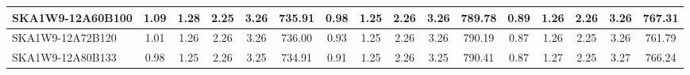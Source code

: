 \begin{table}[H]
{{\begin{tabular}{|lccccc||ccccc||ccccc|}
SKA1W9-12A60B100 & 1.09 \cellcolor{blue!44.85} & 1.28 \cellcolor{red!32.87} & 2.25 \cellcolor{green!28.36} & 3.26 \cellcolor{orange!39.00} & 735.91 \cellcolor{purple!29.65} & 0.98 \cellcolor{blue!44.83} & 1.25 \cellcolor{red!23.18} & 2.26 \cellcolor{green!32.86} & 3.26 \cellcolor{orange!60.00} & 789.78 \cellcolor{purple!18.00} & 0.89 \cellcolor{blue!32.89} & 1.26 \cellcolor{red!23.72} & 2.26 \cellcolor{green!52.62} & 3.26 \cellcolor{orange!32.43} & 767.31 \cellcolor{purple!60.00}\\ \hline 
SKA1W9-12A72B120 & 1.01 \cellcolor{blue!26.99} & 1.26 \cellcolor{red!20.14} & 2.26 \cellcolor{green!42.18} & 3.26 \cellcolor{orange!39.75} & 736.00 \cellcolor{purple!29.93} & 0.93 \cellcolor{blue!26.08} & 1.25 \cellcolor{red!18.00} & 2.26 \cellcolor{green!33.51} & 3.26 \cellcolor{orange!28.35} & 790.19 \cellcolor{purple!26.29} & 0.87 \cellcolor{blue!20.55} & 1.26 \cellcolor{red!33.56} & 2.25 \cellcolor{green!18.00} & 3.26 \cellcolor{orange!18.00} & 761.79 \cellcolor{purple!20.11}\\ \hline 
SKA1W9-12A80B133 & 0.98 \cellcolor{blue!18.00} & 1.25 \cellcolor{red!18.00} & 2.26 \cellcolor{green!45.45} & 3.25 \cellcolor{orange!18.00} & 734.91 \cellcolor{purple!26.39} & 0.91 \cellcolor{blue!18.00} & 1.25 \cellcolor{red!19.92} & 2.26 \cellcolor{green!28.02} & 3.25 \cellcolor{orange!18.00} & 790.41 \cellcolor{purple!30.68} & 0.87 \cellcolor{blue!18.00} & 1.27 \cellcolor{red!36.54} & 2.25 \cellcolor{green!20.84} & 3.27 \cellcolor{orange!60.00} & 766.24 \cellcolor{purple!52.27}\\ \hline 
\end{tabular}}
\vspace{-0.300000cm}
\hspace{1cm} 
}
\end{table}

